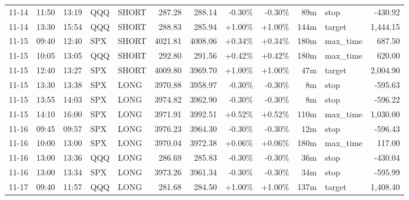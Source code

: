 \documentclass[11pt,a4paper,twoside]{article}
\begin{document}
\begin{center}
\begin{longtable}{>{\color{txtmain}}l l l l l r r r r r >{\color{txtmain}}l r}
11-14 & 11:50 & 13:19 & QQQ & SHORT & 287.28 & 288.14 & \textcolor{lossred}{-0.30\%} & \textcolor{lossred}{-0.30\%} & 89m & stop & \textcolor{lossred}{-430.92} \\
11-14 & 13:30 & 15:54 & QQQ & SHORT & 288.83 & 285.94 & \textcolor{wingreen}{+1.00\%} & \textcolor{wingreen}{+1.00\%} & 144m & target & \textcolor{wingreen}{1,444.15} \\
11-15 & 09:40 & 12:40 & SPX & SHORT & 4021.81 & 4008.06 & \textcolor{wingreen}{+0.34\%} & \textcolor{wingreen}{+0.34\%} & 180m & max\_time & \textcolor{wingreen}{687.50} \\
11-15 & 10:05 & 13:05 & QQQ & SHORT & 292.80 & 291.56 & \textcolor{wingreen}{+0.42\%} & \textcolor{wingreen}{+0.42\%} & 180m & max\_time & \textcolor{wingreen}{620.00} \\
11-15 & 12:40 & 13:27 & SPX & SHORT & 4009.80 & 3969.70 & \textcolor{wingreen}{+1.00\%} & \textcolor{wingreen}{+1.00\%} & 47m & target & \textcolor{wingreen}{2,004.90} \\
11-15 & 13:30 & 13:38 & SPX & LONG & 3970.88 & 3958.97 & \textcolor{lossred}{-0.30\%} & \textcolor{lossred}{-0.30\%} & 8m & stop & \textcolor{lossred}{-595.63} \\
11-15 & 13:55 & 14:03 & SPX & LONG & 3974.82 & 3962.90 & \textcolor{lossred}{-0.30\%} & \textcolor{lossred}{-0.30\%} & 8m & stop & \textcolor{lossred}{-596.22} \\
11-15 & 14:10 & 16:00 & SPX & LONG & 3971.91 & 3992.51 & \textcolor{wingreen}{+0.52\%} & \textcolor{wingreen}{+0.52\%} & 110m & max\_time & \textcolor{wingreen}{1,030.00} \\
11-16 & 09:45 & 09:57 & SPX & LONG & 3976.23 & 3964.30 & \textcolor{lossred}{-0.30\%} & \textcolor{lossred}{-0.30\%} & 12m & stop & \textcolor{lossred}{-596.43} \\
11-16 & 10:00 & 13:00 & SPX & LONG & 3970.04 & 3972.38 & \textcolor{wingreen}{+0.06\%} & \textcolor{wingreen}{+0.06\%} & 180m & max\_time & \textcolor{wingreen}{117.00} \\
11-16 & 13:00 & 13:36 & QQQ & LONG & 286.69 & 285.83 & \textcolor{lossred}{-0.30\%} & \textcolor{lossred}{-0.30\%} & 36m & stop & \textcolor{lossred}{-430.04} \\
11-16 & 13:00 & 13:34 & SPX & LONG & 3973.26 & 3961.34 & \textcolor{lossred}{-0.30\%} & \textcolor{lossred}{-0.30\%} & 34m & stop & \textcolor{lossred}{-595.99} \\
11-17 & 09:40 & 11:57 & QQQ & LONG & 281.68 & 284.50 & \textcolor{wingreen}{+1.00\%} & \textcolor{wingreen}{+1.00\%} & 137m & target & \textcolor{wingreen}{1,408.40} \\

\end{longtable}
\end{center}
\end{document}
